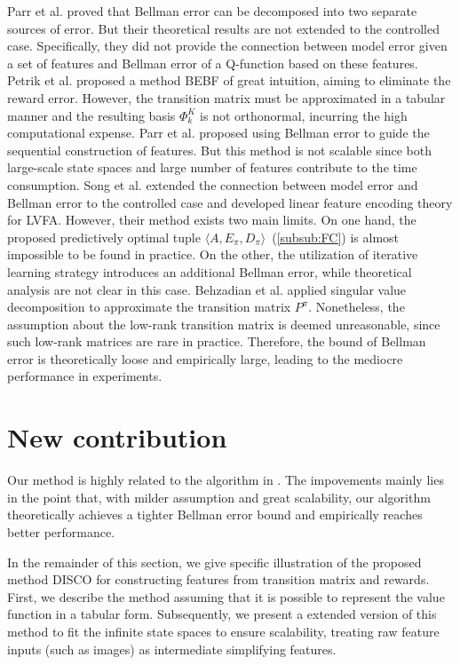 \documentclass[onecolumn, conference]{IEEEtran}
\begin{document}
Parr et al. \cite{Parr2008AnAO} proved that Bellman error can be decomposed into two separate sources of error. But their theoretical results are not extended to the controlled case. Specifically, they did not provide the connection between model 
error given a set of features and Bellman error of a Q-function based on these features. Petrik et al. \cite{Petrik2007AnAO} proposed a method BEBF of great intuition, aiming to eliminate the reward error. However, the transition matrix must be approximated in a tabular manner and the resulting basis ${\Phi_k^K}$ is not orthonormal, incurring the high computational expense. Parr et al. \cite{Parr2007AnalyzingFG} proposed using Bellman error to guide the sequential construction of features. But this method is not scalable since both large-scale state spaces and large number of features 
contribute to the time consumption.
Song et al. \cite{Song2016LinearFE} extended the connection between model error and Bellman error to the controlled case and developed linear feature encoding theory for LVFA. However, their method exists two main limits. On one hand, the proposed predictively optimal tuple $\langle A,E_\pi,D_\pi\rangle$~(\ref{subsub:FC}) is almost impossible to be found in practice. On the other, the utilization of iterative learning strategy introduces an additional Bellman error, while theoretical analysis are not clear in this case. Behzadian et al. \cite{Behzadian2019FeatureSB} applied singular value decomposition to approximate the transition matrix $P^\pi$. Nonetheless, the assumption about the low-rank transition matrix is deemed unreasonable, since such low-rank matrices are rare in practice. Therefore, the bound of Bellman error is theoretically loose and empirically large, leading to the mediocre performance in experiments.
\section{New contribution}\label{sec:contribution}


Our method is highly related to the algorithm in \cite{Song2016LinearFE}\cite{Behzadian2019FeatureSB}. The impovements mainly lies in the point that, with milder assumption and great scalability, our algorithm theoretically achieves a tighter Bellman error bound and empirically reaches better performance. 

In the remainder of this section, we give specific illustration of the proposed method DISCO for constructing features from transition matrix and rewards. First, we describe the method assuming that it is possible to represent the value function in a tabular form. Subsequently, we present a extended version of this method to fit the infinite state spaces to ensure scalability, treating raw feature inputs (such as images) as intermediate simplifying features.
\vspace{4pt}
\end{document}
